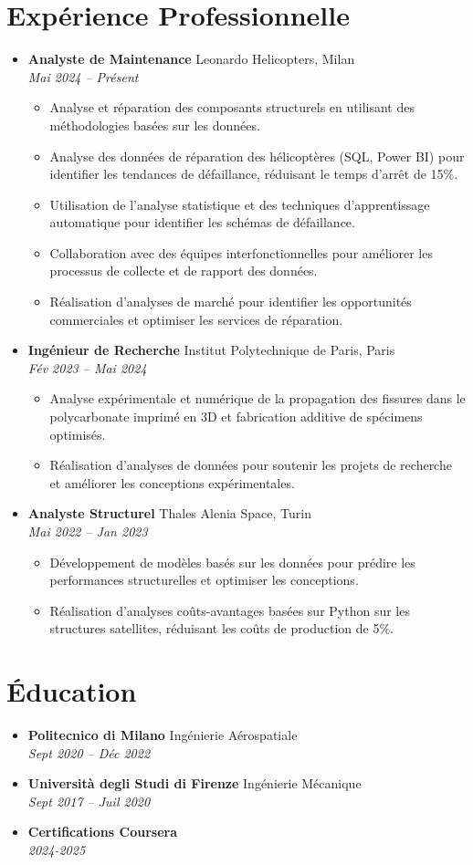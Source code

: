\documentclass[letterpaper,10.5pt]{article}
\newcommand{\resumeEntry}[4]{
  \item\textbf{#1} \hfill #2\\
  \textit{#3} \hfill \textit{#4}
}
\newcommand{\resumeDescription}[1]{
  \vspace{-4pt}\begin{itemize}[leftmargin=0.2in]
    #1
  \end{itemize}
}
\begin{document}
\section*{Expérience Professionnelle}
\begin{itemize}[leftmargin=0.2in]
    \resumeEntry{Analyste de Maintenance}{Leonardo Helicopters, Milan}{Mai 2024 -- Présent}{}
    \resumeDescription{
        \item Analyse et réparation des composants structurels en utilisant des méthodologies basées sur les données.
        \item Analyse des données de réparation des hélicoptères (SQL, Power BI) pour identifier les tendances de défaillance, réduisant le temps d'arrêt de 15\%.
        \item Utilisation de l'analyse statistique et des techniques d'apprentissage automatique pour identifier les schémas de défaillance.
        \item Collaboration avec des équipes interfonctionnelles pour améliorer les processus de collecte et de rapport des données.
        \item Réalisation d'analyses de marché pour identifier les opportunités commerciales et optimiser les services de réparation.
    }
    \resumeEntry{Ingénieur de Recherche}{Institut Polytechnique de Paris, Paris}{Fév 2023 -- Mai 2024}{}
    \resumeDescription{
        \item Analyse expérimentale et numérique de la propagation des fissures dans le polycarbonate imprimé en 3D et fabrication additive de spécimens optimisés.
        \item Réalisation d'analyses de données pour soutenir les projets de recherche et améliorer les conceptions expérimentales.
    }
    \resumeEntry{Analyste Structurel}{Thales Alenia Space, Turin}{Mai 2022 -- Jan 2023}{}
    \resumeDescription{
        \item Développement de modèles basés sur les données pour prédire les performances structurelles et optimiser les conceptions.
        \item Réalisation d'analyses coûts-avantages basées sur Python sur les structures satellites, réduisant les coûts de production de 5\%.
    }
\end{itemize}

\section*{Éducation}
\begin{itemize}[leftmargin=0.2in]
    \resumeEntry{Politecnico di Milano}{Ingénierie Aérospatiale}{Sept 2020 -- Déc 2022}{}
    \resumeEntry{Università degli Studi di Firenze}{Ingénierie Mécanique}{Sept 2017 -- Juil 2020}{}
    \resumeEntry{Certifications Coursera}{}{2024-2025}{}
\end{itemize}
\end{document}
